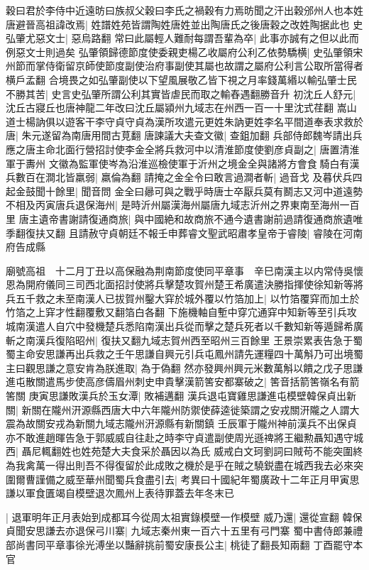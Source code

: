 穀曰君於李侍中近遠昉曰族叔父穀曰李氏之禍穀有力焉昉聞之汗出穀邠州人也本姓唐避晉高祖諱改焉|{
	姓譜姓苑皆謂陶姓唐姓並出陶唐氏之後唐穀之改姓陶据此也}
史弘肇尤惡文士|{
	惡烏路翻}
常曰此屬輕人難耐每謂吾輩為卒|{
	此事亦誠有之但以此而例惡文士則過矣}
弘肇領歸德節度使委親吏楊乙收屬府公利乙依勢驕横|{
	史弘肇領宋州節而掌侍衛留京師使節度副使治府事副使其屬也故謂之屬府公利言公取所當得者横戶孟翻}
合境畏之如弘肇副使以下望風展敬乙皆下視之月率錢萬緡以輸弘肇士民不勝其苦|{
	史言史弘肇所謂公利其實皆虐民而取之輸舂遇翻勝音升}
初沈丘人舒元|{
	沈丘古寢丘也唐神龍二年改曰沈丘屬潁州九域志在州西一百一十里沈式荏翻}
嵩山道士楊訥俱以遊客干李守貞守貞為漢所攻遣元更姓朱訥更姓李名平間道奉表求救於唐|{
	朱元遂留為南唐用間古莧翻}
唐諫議大夫查文徽|{
	查鉏加翻}
兵部侍郎魏岑請出兵應之唐主命北面行營招討使李金全將兵救河中以清淮節度使劉彦貞副之|{
	唐置清淮軍于夀州}
文徽為監軍使岑為沿淮巡檢使軍于沂州之境金全與諸將方會食騎白有漢兵數百在澗北皆羸弱|{
	羸倫為翻}
請掩之金全令曰敢言過澗者斬|{
	過音戈}
及暮伏兵四起金鼓聞十餘里|{
	聞音問}
金全曰曏可與之戰乎時唐士卒厭兵莫有鬭志又河中道遠勢不相及丙寅唐兵退保海州|{
	是時沂州屬漢海州屬唐九域志沂州之界東南至海州一百里}
唐主遺帝書謝請復通商旅|{
	與中國絶和故商旅不通今遺書謝前過請復通商旅遺唯季翻復扶又翻}
且請赦守貞朝廷不報壬申葬睿文聖武昭肅孝皇帝于睿陵|{
	睿陵在河南府告成縣}


廟號高祖　十二月丁丑以高保融為荆南節度使同平章事　辛巳南漢主以内常侍吳懷恩為開府儀同三司西北面招討使將兵擊楚攻賀州楚王希廣遣決勝指揮使徐知新等將兵五千救之未至南漢人已拔賀州鑿大穽於城外覆以竹箔加上|{
	以竹箔覆穽而加土於竹箔之上穽才性翻覆敷又翻箔白各翻}
下施機軸自塹中穿宂通穽中知新等至引兵攻城南漢遣人自穴中發機楚兵悉陷南漢出兵從而擊之楚兵死者以千數知新等遁歸希廣斬之南漢兵復陷昭州|{
	復扶又翻九域志賀州西至昭州三百餘里}
王景崇累表告急于蜀蜀主命安思謙再出兵救之壬午思謙自興元引兵屯鳳州請先運糧四十萬斛乃可出境蜀主曰觀思謙之意安肯為朕進取|{
	為于偽翻}
然亦發興州興元米數萬斛以饋之戊子思謙進屯散關遣馬步使高彦儔眉州刺史申貴擊漢箭筈安都寨破之|{
	筈音括箭筈嶺名有箭筈關}
庚寅思謙敗漢兵於玉女潭|{
	敗補邁翻}
漢兵退屯寶雞思謙進屯模壁韓保貞出新關|{
	新關在隴州汧源縣西唐大中六年隴州防禦使薛逵徙築謂之安戎關汧隴之人謂大震為故關安戎為新關九域志隴州汧源縣有新關鎮}
壬辰軍于隴州神前漢兵不出保貞亦不敢進趙暉告急于郭威威自往赴之時李守貞遣副使周光遜禆將王繼勲聶知遇守城西|{
	聶尼輒翻姓也姓苑楚大夫食采於聶因以為氏}
威戒白文珂劉詞曰賊苟不能突圍終為我禽萬一得出則吾不得復留於此成敗之機於是乎在賊之驍鋭盡在城西我去必來突圍爾曹謹備之威至華州聞蜀兵食盡引去|{
	考異曰十國紀年蜀廣政十二年正月甲寅思謙以軍食匱竭自模壁退次鳳州上表待罪蓋去年冬末已}


|{
	退軍明年正月表始到成都耳今從周太祖實錄模壁一作模壁}
威乃還|{
	還從宣翻}
韓保貞聞安思謙去亦退保弓川寨|{
	九域志秦州東一百六十五里有弓門寨}
蜀中書侍郎兼禮部尚書同平章事徐光溥坐以豔辭挑前蜀安康長公主|{
	桃徒了翻長知兩翻}
丁酉罷守本官

